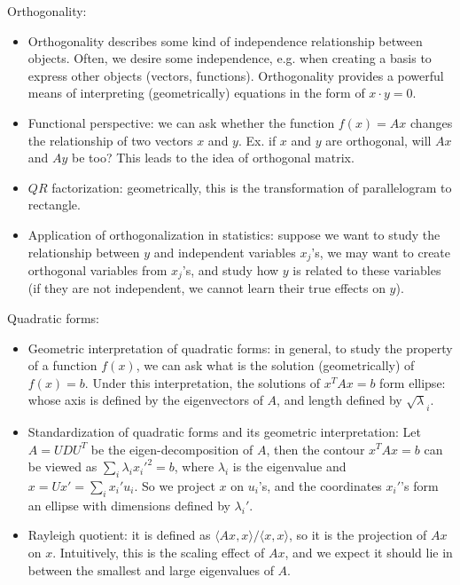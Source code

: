 \documentclass{report}
\begin{document}
Orthogonality: 
\begin{itemize}
	\item Orthogonality describes some kind of independence relationship between objects. Often, we desire some independence, e.g. when creating a basis to express other objects (vectors, functions). Orthogonality provides a powerful means of interpreting (geometrically) equations in the form of $x \cdot y =0$.  
	
	\item Functional perspective: we can ask whether the function $f(x) = Ax$ changes the relationship of two vectors $x$ and $y$. Ex. if $x$ and $y$ are orthogonal, will $Ax$ and $Ay$ be too? This leads to the idea of orthogonal matrix.  
	
	\item $QR$ factorization: geometrically, this is the transformation of parallelogram to rectangle. 
	
	\item Application of orthogonalization in statistics: suppose we want to study the relationship between $y$ and independent variables $x_j$'s, we may want to create orthogonal variables from $x_j$'s, and study how $y$ is related to these variables (if they are not independent, we cannot learn their true effects on $y$).  
\end{itemize}

Quadratic forms: 
\begin{itemize}
	\item Geometric interpretation of quadratic forms: in general, to study the property of a function $f(x)$, we can ask what is the solution (geometrically) of $f(x) = b$. Under this interpretation, the solutions of $x^T A x = b$ form ellipse: whose axis is defined by the eigenvectors of $A$, and length defined by $\sqrt{\lambda}_i$. 
	
	\item Standardization of quadratic forms and its geometric interpretation: Let $A = U D U^T$ be the eigen-decomposition of $A$, then the contour $x^T A x = b$ can be viewed as $\sum_i \lambda_i x_i'^2 = b$, where $\lambda_i$ is the eigenvalue and $x = Ux' = \sum_i x_i' u_i$. So we project $x$ on $u_i$'s, and the coordinates $x_i'$'s form an ellipse with dimensions defined by $\lambda_i'$. 
	
	\item Rayleigh quotient: it is defined as $\langle Ax, x \rangle / \langle x, x \rangle$, so it is the projection of $Ax$ on $x$. Intuitively, this is the scaling effect of $Ax$, and we expect it should lie in between the smallest and large eigenvalues of $A$. 
	
\end{itemize}
\end{document}
